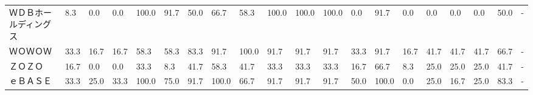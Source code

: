 \begin{tabular}{llllllllllllllllllll}
ＷＤＢホールディングス     &    8.3 &    0.0 &       0.0 &     100.0 &       91.7 &   50.0 &   66.7 &   58.3 &   100.0 &   100.0 &  100.0 &   0.0 &   91.7 &     0.0 &     0.0 &   0.0 &   0.0 &  50.0 &     - \\
ＷＯＷＯＷ           &   33.3 &   16.7 &      16.7 &      58.3 &       58.3 &   83.3 &   91.7 &  100.0 &    91.7 &    91.7 &   91.7 &  33.3 &   91.7 &    16.7 &    41.7 &  41.7 &  41.7 &  66.7 &     - \\
ＺＯＺＯ            &   16.7 &    0.0 &       0.0 &      33.3 &        8.3 &   41.7 &   58.3 &   41.7 &    33.3 &    33.3 &   33.3 &  16.7 &   66.7 &     8.3 &    25.0 &  25.0 &  25.0 &  41.7 &     - \\
ｅＢＡＳＥ           &   33.3 &   25.0 &      33.3 &     100.0 &       75.0 &   91.7 &  100.0 &   66.7 &    91.7 &    91.7 &   91.7 &  50.0 &  100.0 &     0.0 &    25.0 &  16.7 &  25.0 &  83.3 &     - \\
\bottomrule
\end{tabular}
